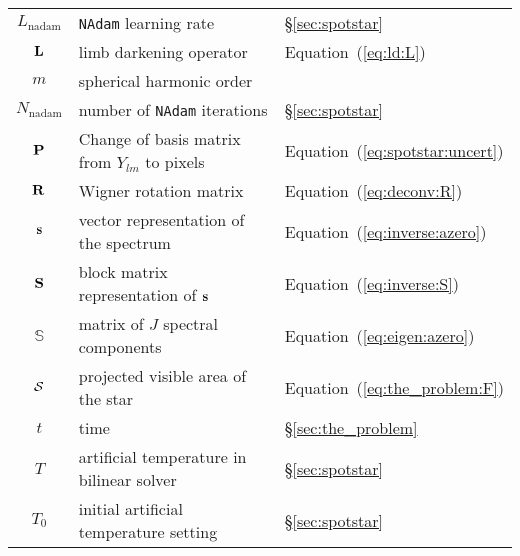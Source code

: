 \documentclass[modern]{aastex631}
\begin{document}
\begin{center}
\begin{longtable}{cll}
        $L_\mathrm{nadam}$                                  & \texttt{NAdam} learning rate                                 & \S\ref{sec:spotstar}                       \\
        ${\mathbf{L}}$                                          & limb darkening operator                                      & Equation~(\ref{eq:ld:L})                   \\
        $m$                                                 & spherical harmonic order                                     &                                            \\
        $N_\mathrm{nadam}$                                  & number of \texttt{NAdam} iterations                          & \S\ref{sec:spotstar}                       \\
        ${\mathbf{P}}$                                          & Change of basis matrix from $Y_{lm}$ to pixels               & Equation~(\ref{eq:spotstar:uncert})        \\
        ${\mathbf{R}}$                                          & Wigner rotation matrix                                       & Equation~(\ref{eq:deconv:R})               \\
        ${\mathbf{s}}$                                          & vector representation of the spectrum                        & Equation~(\ref{eq:inverse:azero})          \\
        ${\mathbf{S}}$                                          & block matrix representation of ${\mathbf{s}}$                    & Equation~(\ref{eq:inverse:S})              \\
        $\boldsymbol{\mathbb{S}}$                           & matrix of $J$ spectral components                            & Equation~(\ref{eq:eigen:azero})            \\
        $\mathcal{S}$                                             & projected visible area of the star                           & Equation~(\ref{eq:the_problem:F})          \\
        $t$                                                 & time                                                         & \S\ref{sec:the_problem}                    \\
        $T$                                                 & artificial temperature in bilinear solver                    & \S\ref{sec:spotstar}                       \\
        $T_0$                                               & initial artificial temperature setting                       & \S\ref{sec:spotstar}                       \\

\end{longtable}
\end{center}
\end{document}
